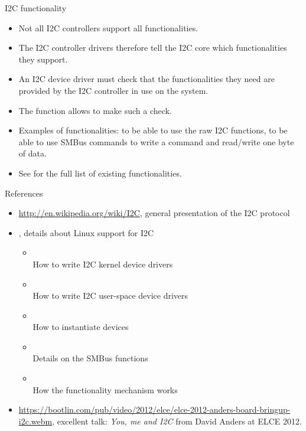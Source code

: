 \begin{frame}{I2C functionality}
  \begin{itemize}
  \item Not all I2C controllers support all functionalities.
  \item The I2C controller drivers therefore tell the I2C core which
    functionalities they support.
  \item An I2C device driver must check that the functionalities they
    need are provided by the I2C controller in use on the system.
  \item The  function allows to make
    such a check.
  \item Examples of functionalities:  to be able to
    use the raw I2C functions,  to be
    able to use SMBus commands to write a command and read/write one
    byte of data.
  \item See  for the full list of
    existing functionalities.
  \end{itemize}
\end{frame}

\begin{frame}{References}
  \begin{itemize}
  \item \url{http://en.wikipedia.org/wiki/I2C}, general presentation
    of the I2C protocol
  \item {}, details about Linux support for I2C
    \begin{itemize}
    \item {}\\
      How to write I2C kernel device drivers
    \item {}\\
      How to write I2C user-space device drivers
    \item {}\\
      How to instantiate devices
    \item {}\\
      Details on the SMBus functions
    \item {}\\
      How the functionality mechanism works
    \end{itemize}
  \item
    \url{https://bootlin.com/pub/video/2012/elce/elce-2012-anders-board-bringup-i2c.webm},
    excellent talk: {\em You, me and I2C} from David Anders at ELCE
    2012.
  \end{itemize}
\end{frame}
